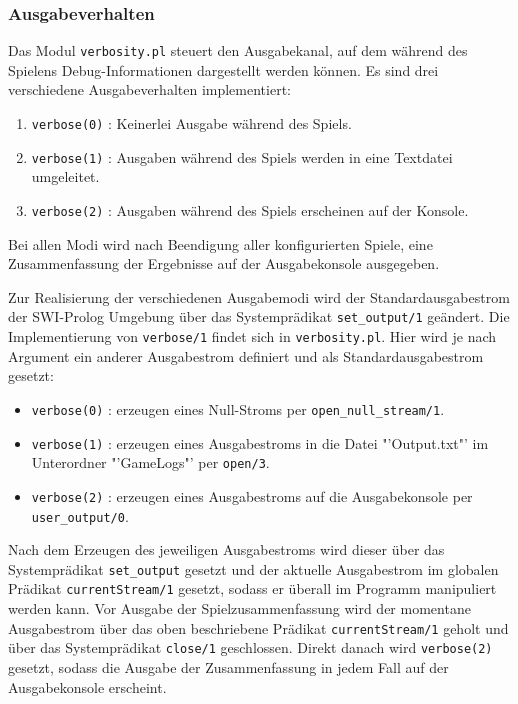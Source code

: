 \subsubsection{Ausgabeverhalten} %
\label{ssub:ausgabeverhalten}
		Das Modul \texttt{verbosity.pl} steuert den Ausgabekanal, auf dem während des Spielens Debug-Informationen dargestellt werden können. 
		Es sind drei verschiedene Ausgabeverhalten implementiert:
			\begin{enumerate}
				\item \texttt{verbose(0)} : Keinerlei Ausgabe während des Spiels.
				\item \texttt{verbose(1)} : Ausgaben während des Spiels werden in eine Textdatei umgeleitet.
				\item \texttt{verbose(2)} : Ausgaben während des Spiels erscheinen auf der Konsole.
			\end{enumerate}
			Bei allen Modi wird nach Beendigung aller konfigurierten Spiele, eine Zusammenfassung der Ergebnisse auf der Ausgabekonsole ausgegeben.

			Zur Realisierung der verschiedenen Ausgabemodi wird der Standardausgabestrom der SWI-Prolog Umgebung über das Systemprädikat \texttt{set\_output/1} 
			geändert. Die Implementierung von \texttt{verbose/1} findet sich in \texttt{verbosity.pl}. Hier wird je nach Argument ein anderer Ausgabestrom 
			definiert und als Standardausgabestrom gesetzt:
			\begin{itemize}
				\item \texttt{verbose(0)} : erzeugen eines Null-Stroms per \texttt{open\_null\_stream/1}.
				\item \texttt{verbose(1)} : erzeugen eines Ausgabestroms in die Datei "'Output.txt"' im Unterordner "'GameLogs"' per \texttt{open/3}.
				\item \texttt{verbose(2)} : erzeugen eines Ausgabestroms auf die Ausgabekonsole per \texttt{user\_output/0}.
			\end{itemize}
			Nach dem Erzeugen des jeweiligen Ausgabestroms wird dieser über das Systemprädikat \texttt{set\_output} gesetzt und der aktuelle Ausgabestrom 
			im globalen Prädikat \texttt{currentStream/1} gesetzt, sodass er überall im Programm manipuliert werden kann.
			Vor Ausgabe der Spielzusammenfassung wird der momentane Ausgabestrom über das oben beschriebene Prädikat \texttt{currentStream/1} geholt und 
			über das Systemprädikat \texttt{close/1} geschlossen. Direkt danach wird \texttt{verbose(2)} gesetzt, sodass die Ausgabe 
			der Zusammenfassung in jedem Fall auf der Ausgabekonsole erscheint.
	

